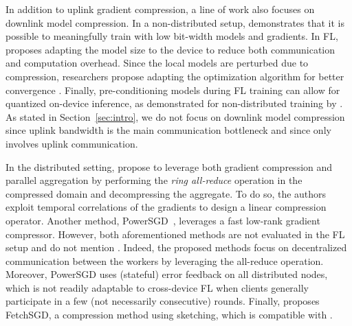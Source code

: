  In addition to uplink gradient compression, a line of work also focuses on downlink model compression. In a non-distributed setup, \cite{zhou2016dorefanet, courbariaux2015binaryconnect} demonstrates that it is possible to meaningfully train with low bit-width models and gradients. In FL, \cite{jiang2019model} proposes adapting the model size to the device to reduce both communication and computation overhead. Since the local models are perturbed due to compression, researchers propose adapting the optimization algorithm for better convergence \cite{liu2019double,sattler2019robust,tang2019doublesqueeze,zheng2019communicationefficient,amiri2020federated,philippenko2021preserved}.
Finally, pre-conditioning models during FL training can allow for quantized on-device inference, as demonstrated for non-distributed training by \cite{gupta2015deep, krishnamoorthi2018quantizing}. As stated in Section~\ref{sec:intro}, we do not focus on downlink model compression since uplink bandwidth is the main communication bottleneck and since \SecAgg only involves uplink communication.

 In the distributed setting, \cite{yu2018gradiveq} propose to leverage both gradient compression and parallel aggregation by performing the \emph{ring all-reduce} operation in the compressed domain and decompressing the aggregate. To do so, the authors exploit temporal correlations of the gradients to design a linear compression operator.
Another method, PowerSGD~\cite{vogels2019powersgd}, leverages a fast low-rank gradient compressor. However, both aforementioned methods are not evaluated in the FL setup and do not mention \SecAgg.
Indeed, the proposed methods focus on decentralized communication between the workers by leveraging the all-reduce operation.
Moreover, PowerSGD uses (stateful) error feedback on all distributed nodes, which is not readily adaptable to cross-device FL when clients generally participate in a few (not necessarily consecutive) rounds.
Finally, \cite{rothchild2020fetchsgd} proposes FetchSGD, a compression method using sketching, which is compatible with \SecAgg.





